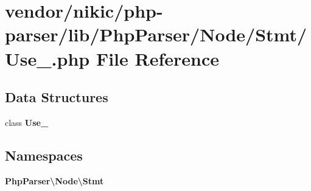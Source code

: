 \section{vendor/nikic/php-\/parser/lib/\+Php\+Parser/\+Node/\+Stmt/\+Use\+\_\+.php File Reference}
\label{_node_2_stmt_2_use___8php}
\subsection*{Data Structures}
\begin{DoxyCompactItemize}
\item 
class {\bf Use\+\_\+}
\end{DoxyCompactItemize}
\subsection*{Namespaces}
\begin{DoxyCompactItemize}
\item 
 {\bf Php\+Parser\textbackslash{}\+Node\textbackslash{}\+Stmt}
\end{DoxyCompactItemize}
